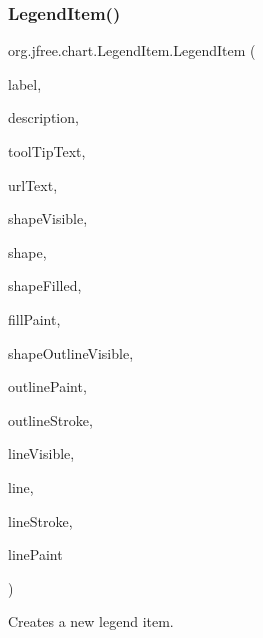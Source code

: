 \subsubsection{\texorpdfstring{Legend\+Item()}{LegendItem()}\hspace{0.1cm}{\footnotesize\ttfamily [10/10]}}
{\footnotesize\ttfamily org.\+jfree.\+chart.\+Legend\+Item.\+Legend\+Item (\begin{DoxyParamCaption}\item[{Attributed\+String}]{label,  }\item[{String}]{description,  }\item[{String}]{tool\+Tip\+Text,  }\item[{String}]{url\+Text,  }\item[{boolean}]{shape\+Visible,  }\item[{Shape}]{shape,  }\item[{boolean}]{shape\+Filled,  }\item[{Paint}]{fill\+Paint,  }\item[{boolean}]{shape\+Outline\+Visible,  }\item[{Paint}]{outline\+Paint,  }\item[{Stroke}]{outline\+Stroke,  }\item[{boolean}]{line\+Visible,  }\item[{Shape}]{line,  }\item[{Stroke}]{line\+Stroke,  }\item[{Paint}]{line\+Paint }\end{DoxyParamCaption})}

Creates a new legend item.



